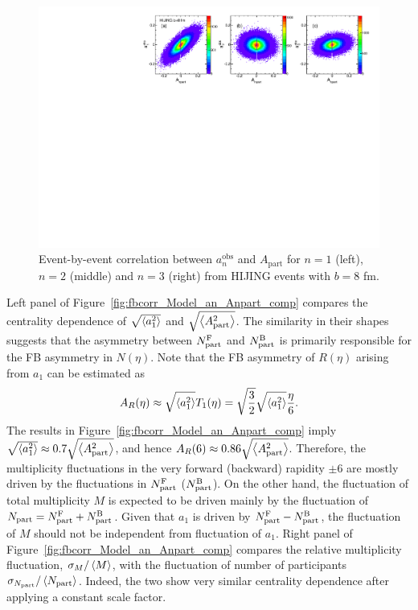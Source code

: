 \begin{figure}[H]
\centering
\includegraphics[width=.95\linewidth]{figs/chapter_fbcorr/Model_an_Anpart.pdf}
\caption{Event-by-event correlation between $a_n^\text{obs}$ and $A_\text{part}$ for $n=1$ (left), $n=2$ (middle) and $n=3$ (right) from HIJING events with $b=8$ fm.}
\label{fig:fbcorr_Model_an_Anpart}
\end{figure}

Left panel of Figure~\ref{fig:fbcorr_Model_an_Anpart_comp} compares the centrality dependence of $\sqrt{\left\langle a_1^2\right\rangle}$ and $\sqrt{\left\langle A_\text{part}^2\right\rangle}$. The similarity in their shapes suggests that the asymmetry between $N_\text{part}^\text{F}$ and $N_\text{part}^\text{B}$ is primarily responsible for the FB asymmetry in $N(\eta)$. Note that the FB asymmetry of $R(\eta)$ arising from $a_1$ can be estimated as
\begin{equation}
A_R(\eta) \approx \sqrt{\left\langle a_1^2\right\rangle} T_1(\eta) = \sqrt{\frac{3}{2}}\sqrt{\left\langle a_1^2\right\rangle}\frac{\eta}{6}.
\end{equation}
The results in Figure~\ref{fig:fbcorr_Model_an_Anpart_comp} imply $\sqrt{\left\langle a_1^2\right\rangle} \approx 0.7 \sqrt{\left\langle A_\text{part}^2\right\rangle}$, and hence $A_R(6) \approx 0.86 \sqrt{\left\langle A_\text{part}^2\right\rangle}$. Therefore, the multiplicity fluctuations in the very forward (backward) rapidity $\pm 6$ are mostly driven by the fluctuations in $N_\text{part}^\text{F}$ ($N_\text{part}^\text{B}$). On the other hand, the fluctuation of total multiplicity $M$ is expected to be driven mainly by the fluctuation of $N_\text{part} = N_\text{part}^\text{F} + N_\text{part}^\text{B}$. Given that $a_1$ is driven by $N_\text{part}^\text{F}-N_\text{part}^\text{B}$, the fluctuation of $M$ should not be independent from fluctuation of $a_1$. Right panel of Figure~\ref{fig:fbcorr_Model_an_Anpart_comp} compares the relative multiplicity fluctuation, $\sigma_M / \left\langle M\right\rangle$, with the fluctuation of number of participants $\sigma_{N_\text{part}} / \left\langle N_\text{part}\right\rangle$. Indeed, the two show very similar centrality dependence after applying a constant scale factor.

